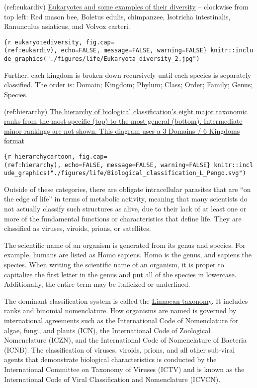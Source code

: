 \documentclass[
]{article}
\begin{document}
(ref:eukardiv)
\href{https://commons.wikimedia.org/wiki/File:Eukaryota_diversity_2.jpg}{Eukaryotes
and some examples of their diversity} -- clockwise from top left: Red
mason bee, Boletus edulis, chimpanzee, Isotricha intestinalis,
Ranunculus asiaticus, and Volvox carteri.

\texttt{\{r\ eukaryotediversity,\ fig.cap=\textquotesingle{}(ref:eukardiv)\textquotesingle{},\ echo=FALSE,\ message=FALSE,\ warning=FALSE\}\ knitr::include\_graphics("./figures/life/Eukaryota\_diversity\_2.jpg")}

Further, each kingdom is broken down recursively until each species is
separately classified. The order is: Domain; Kingdom; Phylum; Class;
Order; Family; Genus; Species.

(ref:hierarchy)
\href{https://commons.wikimedia.org/wiki/File:Biological_classification_L_Pengo.svg}{The
hierarchy of biological classification's eight major taxonomic ranks
from the most specific (top) to the most general (bottom). Intermediate
minor rankings are not shown. This diagram uses a 3 Domains / 6 Kingdoms
format}

\texttt{\{r\ hierarchycartoon,\ fig.cap=\textquotesingle{}(ref:hierarchy)\textquotesingle{},\ echo=FALSE,\ message=FALSE,\ warning=FALSE\}\ knitr::include\_graphics("./figures/life/Biological\_classification\_L\_Pengo.svg")}

Outside of these categories, there are obligate intracellular parasites
that are ``on the edge of life'' in terms of metabolic activity, meaning
that many scientists do not actually classify such structures as alive,
due to their lack of at least one or more of the fundamental functions
or characteristics that define life. They are classified as viruses,
viroids, prions, or satellites.

The scientific name of an organism is generated from its genus and
species. For example, humans are listed as Homo sapiens. Homo is the
genus, and sapiens the species. When writing the scientific name of an
organism, it is proper to capitalize the first letter in the genus and
put all of the species in lowercase. Additionally, the entire term may
be italicized or underlined.

The dominant classification system is called the
\href{https://en.wikipedia.org/wiki/Linnaean_taxonomy}{Linnaean
taxonomy}. It includes ranks and binomial nomenclature. How organisms
are named is governed by international agreements such as the
International Code of Nomenclature for algae, fungi, and plants (ICN),
the International Code of Zoological Nomenclature (ICZN), and the
International Code of Nomenclature of Bacteria (ICNB). The
classification of viruses, viroids, prions, and all other sub-viral
agents that demonstrate biological characteristics is conducted by the
International Committee on Taxonomy of Viruses (ICTV) and is known as
the International Code of Viral Classification and Nomenclature (ICVCN).
\end{document}
